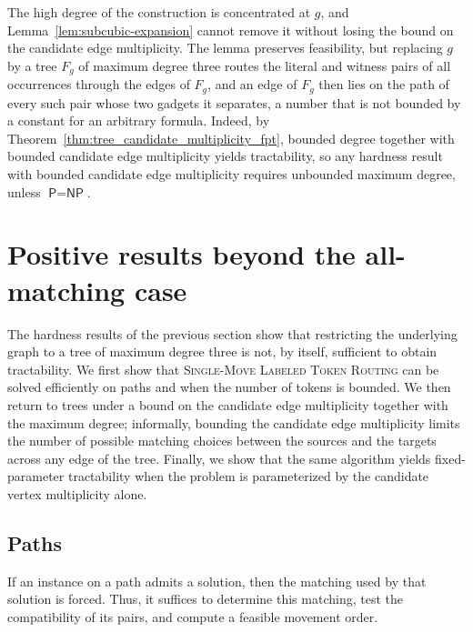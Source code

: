 \documentclass[a4paper,USenglish,thm-restate]{lipics-v2021}
\theoremstyle{problemstyle}
\begin{document}
The high degree of the construction is concentrated at $g$, and
Lemma~\ref{lem:subcubic-expansion} cannot remove it without losing the
bound on the candidate edge multiplicity. The lemma preserves feasibility,
but replacing $g$ by a tree $F_g$ of maximum degree three routes the
literal and witness pairs of all occurrences through the edges of $F_g$,
and an edge of $F_g$ then lies on the path of every such pair whose two
gadgets it separates, a number that is not bounded by a constant for an
arbitrary formula. Indeed, by
Theorem~\ref{thm:tree_candidate_multiplicity_fpt}, bounded degree together
with bounded candidate edge multiplicity yields tractability, so any
hardness result with bounded candidate edge multiplicity requires unbounded
maximum degree, unless $\textsf{P}=\textsf{NP}$.


\section{Positive results beyond the all-matching case}
\label{sec:positive}

The hardness results of the previous section show that restricting the
underlying graph to a tree of maximum degree three is not, by itself,
sufficient to obtain tractability. We first show that \textsc{Single-Move
Labeled Token Routing} can be solved efficiently on paths and when the number
of tokens is bounded. We then return to trees under a bound on the candidate
edge multiplicity together with the maximum degree; informally, bounding the
candidate edge multiplicity limits the number of possible matching choices
between the sources and the targets across any edge of the tree. Finally, we
show that the same algorithm yields fixed-parameter tractability when the
problem is parameterized by the candidate vertex multiplicity alone.

\subsection{Paths}
\label{sec:paths}

If an instance on a path admits a solution, then the matching used by
that solution is forced. Thus, it suffices to determine this matching, test
the compatibility of its pairs, and compute a feasible movement order.

\pathTime*
\end{document}
